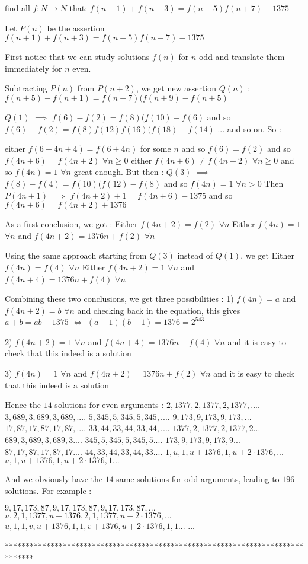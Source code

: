 \begin{solution}
	\begin{tcolorbox}find all $ f: N \to N$ that:
$ f(n + 1) + f(n + 3) = f(n + 5)f(n + 7) - 1375$\end{tcolorbox}

Let $ P(n)$ be the assertion $ f(n+1)+f(n+3)=f(n+5)f(n+7)-1375$

First notice that we can study solutions $ f(n)$ for $ n$ odd and translate them immediately for $ n$ even.

Subtracting $ P(n)$ from $ P(n+2)$, we get new assertion $ Q(n)$ : $ f(n+5)-f(n+1)=f(n+7)(f(n+9)-f(n+5)$

$ Q(1)$ $ \implies$ $ f(6)-f(2)=f(8)(f(10)-f(6)$ and so $ f(6)-f(2)=f(8)f(12)f(16)(f(18)-f(14)$ ... and so on. So :

either $ f(6+4n+4)=f(6+4n)$ for some $ n$ and so $ f(6)=f(2)$ and so $ f(4n+6)=f(4n+2)$ $ \forall n\ge 0$
either $ f(4n+6)\ne f(4n+2)$ $ \forall n\ge 0$ and so $ f(4n)=1$ $ \forall n$ great enough. But then :
$ Q(3)$ $ \implies$ $ f(8)-f(4)=f(10)(f(12)-f(8)$ and so $ f(4n)=1$ $ \forall n>0$
Then $ P(4n+1)$ $ \implies$ $ f(4n+2)+1=f(4n+6)-1375$ and so $ f(4n+6)=f(4n+2)+1376$

As a first conclusion, we got :
Either $ f(4n+2)=f(2)$ $ \forall n$
Either $ f(4n)=1$ $ \forall n$ and $ f(4n+2)=1376n+f(2)$ $ \forall n$

Using the same approach starting from $ Q(3)$ instead of $ Q(1)$, we get 
Either $ f(4n)=f(4)$ $ \forall n$
Either $ f(4n+2)=1$ $ \forall n$ and $ f(4n+4)=1376n+f(4)$ $ \forall n$

Combining these two conclusions, we get three possibilities :
1) $ f(4n)=a$ and $ f(4n+2)=b$ $ \forall n$ and checking back in the equation, this gives $ a+b=ab-1375$ $ \iff$ $ (a-1)(b-1)=1376=2^543$

2) $ f(4n+2)=1$ $ \forall n$ and $ f(4n+4)=1376n+f(4)$ $ \forall n$ and it is easy to check that this indeed is a solution

3) $ f(4n)=1$ $ \forall n$ and $ f(4n+2)=1376n+f(2)$ $ \forall n$ and it is easy to check that this indeed is a solution

Hence the $ 14$ solutions for even arguments :
$ 2,1377,2,1377,2,1377, ....$
$ 3,689,3,689,3,689,....$
$ 5,345,5,345,5,345,....$
$ 9,173,9,173,9,173,...$
$ 17,87,17,87,17,87,....$
$ 33,44,33,44,33,44,....$
$ 1377,2,1377,2,1377,2 ...$
$ 689,3,689,3,689,3....$
$ 345,5,345,5,345,5....$
$ 173,9,173,9,173,9...$
$ 87,17,87,17,87,17....$
$ 44,33,44,33,44,33....$
$ 1,u,1,u+1376,1,u+2\cdot 1376, ...$
$ u,1,u+1376,1,u+2\cdot 1376,1 ...$

And we obviously have the $ 14$ same solutions for odd arguments, leading to $ 196$ solutions.
For example :

$ 9,17,173,87,9,17,173,87,9,17,173,87,...$
$ u,2,1,1377,u+1376,2,1,1377,u+2\cdot 1376, ...$
$ u,1,1,v,u+1376,1,1,v+1376, u+2\cdot 1376,1,1  ...$
...
\end{solution}
*******************************************************************************
-------------------------------------------------------------------------------

